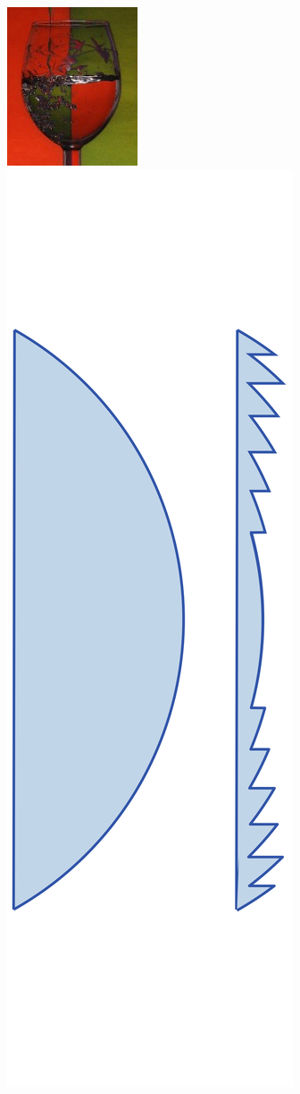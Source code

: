 \begin{figure}[!ht]
\centering
\includegraphics[width=5truecm]{slike/Water.jpeg}\hfill
\includegraphics[height=7truecm]{slike/02_FresnelLeca.png}\hfill

\end{figure}
